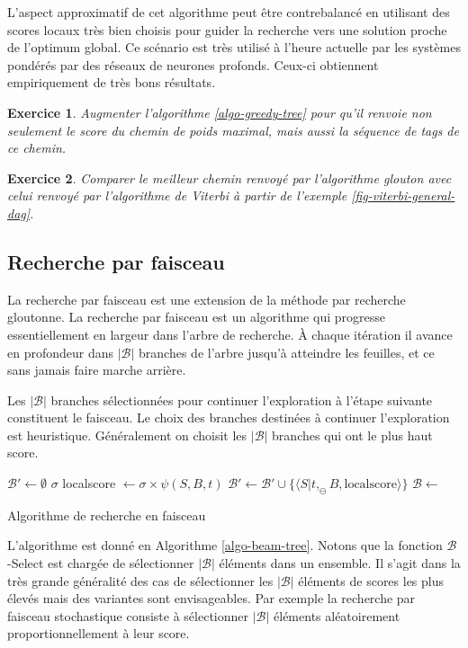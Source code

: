 \documentclass[11pt,openany]{book}
\newtheorem{exo}{Exercice}[chapter]
\newcommand{\ac}[1]{{\sc #1}} %
\begin{document}
L'aspect approximatif de cet algorithme peut être contrebalancé
en utilisant des scores locaux  très bien choisis pour guider la recherche vers une solution proche de
l'optimum global. Ce
scénario est très utilisé à l'heure actuelle par les systèmes pondérés
par des réseaux de neurones profonds. Ceux-ci  obtiennent
empiriquement de très
bons résultats.

\begin{exo}
Augmenter l'algorithme \ref{algo-greedy-tree} pour qu'il renvoie
non seulement le score du chemin de poids maximal, mais aussi
la séquence de tags de ce chemin.
\end{exo}
\begin{exo}
Comparer le meilleur chemin renvoyé par l'algorithme glouton avec
celui 
renvoyé par l'algorithme de Viterbi à partir de l'exemple \ref{fig-viterbi-general-dag}.
\end{exo}

\subsection{Recherche par faisceau}

La recherche par faisceau est une extension de la méthode par recherche gloutonne.
La recherche par faisceau est un algorithme qui progresse
essentiellement en largeur dans l'arbre de recherche. \`A chaque itération il avance en
profondeur dans $|\mathcal{B}|$ branches de l'arbre jusqu'à atteindre les
feuilles, et ce sans jamais faire marche arrière.

Les $|\mathcal{B}|$ branches sélectionnées pour continuer l'exploration à l'étape
suivante constituent le faisceau. 
Le choix des branches destinées à continuer l'exploration 
est heuristique. Généralement on choisit les $|\mathcal{B}|$ branches qui ont le
plus haut score. 

\begin{algorithm}[htbp]
\begin{algorithmic}[1]
\State $\mathcal{B}' \gets \emptyset$
\State \Return $\sigma$
\EndIf
{}
	\State localscore $\gets \sigma \times \psi(S,B,t)$
        \State $\mathcal{B'} \gets \mathcal{B}' \cup \{\langle
        S|t,_\ominus B,\text{localscore}\rangle\}$
\EndFor
\EndFor
\State $\mathcal{B} \gets$ 
\State \Return {}
\EndFunction
\end{algorithmic}
\caption{\label{algo-beam-tree}Algorithme de recherche en faisceau}
\end{algorithm}
L'algorithme est donné en Algorithme \ref{algo-beam-tree}.
Notons que la fonction \ac{$\mathcal{B}$-Select} est chargée de sélectionner $|\mathcal{B}|$ éléments dans un
ensemble. Il s'agit dans la très grande généralité des cas
 de sélectionner les $|\mathcal{B}|$ éléments de scores les plus élevés 
 mais des variantes sont envisageables. Par exemple la recherche par faisceau
 stochastique consiste à sélectionner $|\mathcal{B}|$ éléments aléatoirement
 proportionnellement à leur score. 
\end{document}
